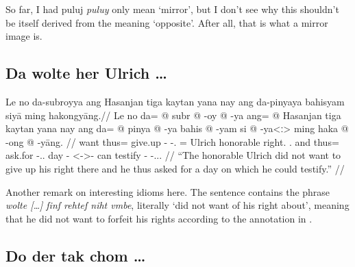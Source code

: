 \documentclass[12pt,paper=a4]{scrartcl}
\newcommand{\fw}[1]{\textit{#1}} %
\newcommand{\ayr}[1]{{\Tagati #1}}
\begin{document}
So far, I had \ayr{puluj} \fw{puluy} only mean `mirror', but I don't see why 
this shouldn't be itself derived from the meaning `opposite'. After all, that is 
what a mirror image is.

\subsection*{Da wolte her Ulrich …}


\ex \begingl
	\glpreamble Le no da-subroyya ang Hasanjan tiga kaytan yana nay 
		ang da-pinyaya bahisyam siyā ming ha\-kong\-yāng.//
	\gla Le no da= @ subr @ -oy @ -ya ang= @ Hasanjan tiga kaytan yana 
		nay ang da= @ pinya @ -ya bahis @ -yam si @ -ya<ː> ming haka 
		@ -ong @ -yāng. //
	\glb \PatT{} want thus= give.up -\Neg{} -\Tsg{}.\M{} \Aarg{}= Ulrich 
		honorable right.\Top{} \Tsg{}.\Gen{} and \AgtT{} thus= ask.for 
		-\Tsg{}.\M{}.\Top{} day -\Dat{} \Rel{} <-\Dat{}>-\Loc{} can 
		testify -\Irr{} -\Tsg{}.\M{}.\Aarg{}. //
	\glft \enquote{The honorable Ulrich did not want to give up his right 
		there and he thus asked for a day on which he could testify.} //
\endgl \xe

Another remark on interesting idioms here. The \Mhg{} sentence contains the 
phrase \fw{wolte […] ſinſ rehteſ niht vmbe}, literally `did not want of his 
right about', meaning that he did not want to forfeit his rights according to 
the annotation in \textcite{n163-online}.

\subsection*{Do der tak chom …}

\end{document}
